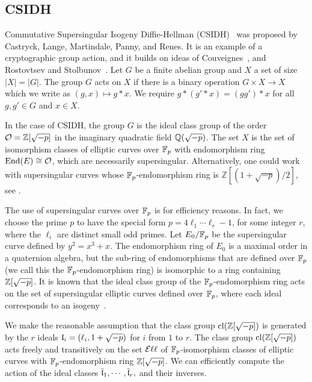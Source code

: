 
\subsection{CSIDH\label{sec:CSIDH}}


Commutative Supersingular Isogeny Diffie-Hellman (CSIDH)~\cite{CSIDH} was proposed by Castryck, Lange, Martindale, Panny, and Renes. It is an example of a cryptographic group action, and it builds on ideas of Couveignes~\cite{Couv06}, and Rostovtsev and Stolbunov~\cite{RosSto}.
Let $G$ be a finite abelian group and $X$ a set of size $|X|=|G|$. The group $G$ acts on $X$ if there is a binary operation $G \times X \to X$ which we write as $(g,x) \mapsto g*x$. We require $g*( g'*x) = (gg')*x$ for all $g, g' \in G$ and $x \in X$.

In the case of CSIDH, the group $G$ is the ideal class group of the order $\mathcal{O} = \mathbb{Z}[\sqrt{-p}]$ in  the imaginary quadratic field $\mathbb{Q}( \sqrt{-p} )$.
The set $X$ is the set of isomorphism classes of elliptic  curves over $\mathbb{F}_p$ with endomorphism ring $\text{End}(E) \cong \mathcal{O}$, which are necessarily supersingular.
Alternatively, one could work with supersingular curves whose $\mathbb{F}_p$-endomorphism ring is $\mathbb{Z}[(1+\sqrt{-p})/2]$, see \cite{CD20}.


The use of supersingular curves over $\mathbb{F}_p$ is for efficiency reasons.
In fact, we choose the prime $p$ to have the special form $p = 4\ell_1 \cdots \ell_r -1$, for some integer $r$, where the $\ell_i$ are distinct small odd primes.
Let $E_0/\mathbb{F}_p$ be the supersingular curve defined by $y^2 = x^3 + x$. 
The endomorphism ring of $E_0$ is a maximal order in a quaternion algebra, but  the sub-ring of endomorphisms that are defined over $\mathbb{F}_p$ (we call this the $\mathbb{F}_p$-endomorphism ring) is isomorphic to a ring containing $\mathbb{Z}[\sqrt{-p}]$. 
It is known that the ideal class group of the $\mathbb{F}_p$-endomorphism ring acts on the set of supersingular elliptic curves defined over $\mathbb{F}_p$, where each ideal corresponds to an isogeny~\cite{Waterhouse}.

We make the reasonable assumption that the class group $\text{cl}(\mathbb{Z}[\sqrt{-p}])$ is generated by the $r$ ideals $\mathfrak{l}_i = (\ell_i, 1 + \sqrt{-p} )$ for $i$ from $1$ to $r$.
The class group $\text{cl}(\mathbb{Z}[\sqrt{-p}])$ acts freely and transitively on the set $\mathcal{E}\ell\ell$ of $\mathbb{F}_p$-isomorphism classes of elliptic curves with $\mathbb{F}_p$-endomorphism ring $\mathbb{Z}[\sqrt{-p}]$. We can efficiently compute the action of the ideal classes $\overline{\mathfrak{l}}_1,\cdots,\overline{\mathfrak{l}}_r,$ and their inverses.

